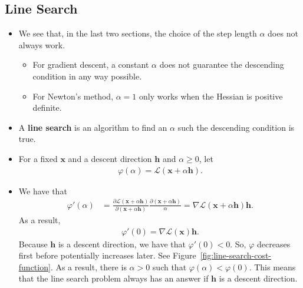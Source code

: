 \documentclass[10pt]{article}
\newcommand{\ve}[1]{\mathbf{#1}}
\newcommand{\mcal}[1]{\mathcal{#1}}
\begin{document}
\subsection{Line Search}

\begin{itemize}
    \item We see that, in the last two sections, the choice of the step length $\alpha$ does not always work.
    \begin{itemize}
        \item For gradient descent, a constant $\alpha$ does not guarantee the descending condition in any way possible.
        \item For Newton's method, $\alpha = 1$ only works when the Hessian is positive definite.
    \end{itemize}

    \item A {\bf line search} is an algorithm to find an $\alpha$ such the descending condition is true.
    
    \item For a fixed $\ve{x}$ and a descent direction $\ve{h}$ and $\alpha \geq 0$, let
    \begin{align*}
        \varphi(\alpha) = \mcal{L}(\ve{x} + \alpha \ve{h}).
    \end{align*}
    
    \item We have that
    \begin{align*}
        \varphi'(\alpha) 
        &= \frac{\partial \mcal{L}(\ve{x} + \alpha \ve{h})}{\partial (\ve{x} + \alpha \ve{h})} \frac{\partial(\ve{x} + \alpha \ve{h})}{\alpha}
        = \nabla \mcal{L}(\ve{x} + \alpha \ve{h}) \ve{h}.
    \end{align*}
    As a result,
    \begin{align*}
        \varphi'(0) = \nabla \mcal{L}(\ve{x}) \ve{h}.
    \end{align*}
    Because $\ve{h}$ is a descent direction, we have that $\varphi'(0) < 0$. So, $\varphi$ decreases first before potentially increases later. See Figure~\ref{fig:line-search-cost-function}. As a result, there is $\alpha > 0$ such that $\varphi(\alpha) < \varphi(0)$. This means that the line search problem always has an answer if $\ve{h}$ is a descent direction.


\end{itemize}
\end{document}
